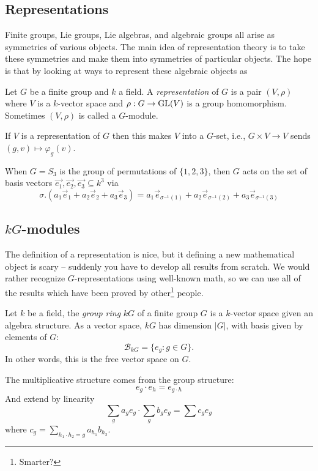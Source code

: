 \documentclass[twoside,11pt,reqno]{amsart}
\begin{document}
\subsection{Representations}

Finite groups, Lie groups, Lie algebras, and algebraic groups all arise as symmetries of various objects. The main idea of representation theory is to take these symmetries and make them into symmetries of particular objects. The hope is that by looking at ways to represent these algebraic objects as

\begin{definition}
  Let $G$ be a finite group and $k$ a field. A \emph{representation} of $G$ is a pair $(V,\rho)$ where $V$ is a $k$-vector space and $\rho: G \to \operatorname{GL}(V)$ is a group homomorphism. Sometimes $(V,\rho)$ is called a $G$-module.
\end{definition}

If $V$ is a representation of $G$ then this makes $V$ into a $G$-set, i.e., $G \times V \to V$ sends $(g,v) \mapsto \varphi_g(v)$.

\begin{example}
  When $G = S_3$ is the group of permutations of $\{1,2,3\}$, then $G$ acts on the set of basis vectors $\vec{e_1}, \vec{e_2}, \vec{e_3} \subseteq k^3$ via
  \[
    \sigma . (a_1 \vec{e}_1 + a_2 \vec{e}_2 + a_3 \vec{e}_3) = a_1 \vec{e}_{\sigma^{-1}(1)} + a_2 \vec{e}_{\sigma^{-1}(2)} + a_3 \vec{e}_{\sigma^{-1}(3)}
  \]
\end{example}

\subsection{$kG$-modules}
\label{sec:kG-modules}

The definition of a representation is nice, but it defining a new mathematical object is scary -- suddenly you have to develop all results from scratch. We would rather recognize $G$-representations using well-known math, so we can use all of the results which have been proved by other\footnote{Smarter?} people.

\begin{definition}
  Let $k$ be a field, the \emph{group ring} $kG$ of a finite group $G$ is a $k$-vector space given an algebra structure. As a vector space, $kG$ has dimension $|G|$, with basis given by elements of $G$:
  \[
    \mathcal{B}_{kG}  = \{ e_g : g \in G\}.
  \]
  In other words, this is the free vector space on $G$.

  The multiplicative structure comes from the group structure:
  \[
e_g \cdot e_h = e_{g \cdot h}
  \]
  And extend by linearity
  \[
    \sum_g a_g e_g \cdot \sum_g b_g e_g = \sum c_g e_g
  \]
  where $c_g = \sum_{h_1 \cdot h_2 = g} a_{h_1} b_{h_2}$.
\end{definition}
\end{document}
